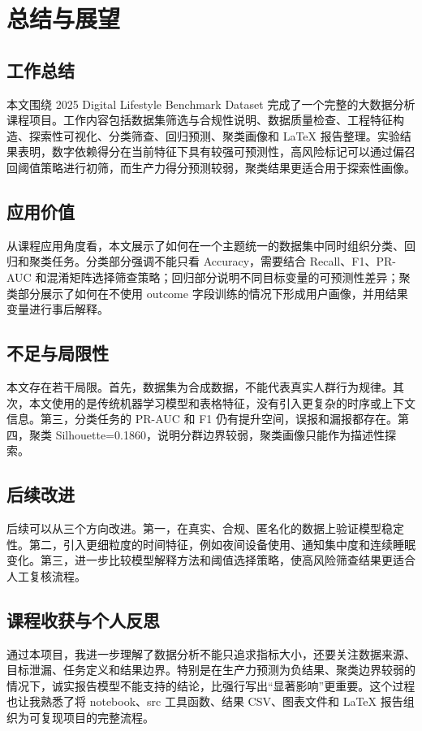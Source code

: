 \chapter{总结与展望}

\section{工作总结}

本文围绕 2025 Digital Lifestyle Benchmark Dataset 完成了一个完整的大数据分析课程项目。工作内容包括数据集筛选与合规性说明、数据质量检查、工程特征构造、探索性可视化、分类筛查、回归预测、聚类画像和 LaTeX 报告整理。实验结果表明，数字依赖得分在当前特征下具有较强可预测性，高风险标记可以通过偏召回阈值策略进行初筛，而生产力得分预测较弱，聚类结果更适合用于探索性画像。

\section{应用价值}

从课程应用角度看，本文展示了如何在一个主题统一的数据集中同时组织分类、回归和聚类任务。分类部分强调不能只看 Accuracy，需要结合 Recall、F1、PR-AUC 和混淆矩阵选择筛查策略；回归部分说明不同目标变量的可预测性差异；聚类部分展示了如何在不使用 outcome 字段训练的情况下形成用户画像，并用结果变量进行事后解释。

\section{不足与局限性}

本文存在若干局限。首先，数据集为合成数据，不能代表真实人群行为规律。其次，本文使用的是传统机器学习模型和表格特征，没有引入更复杂的时序或上下文信息。第三，分类任务的 PR-AUC 和 F1 仍有提升空间，误报和漏报都存在。第四，聚类 Silhouette=0.1860，说明分群边界较弱，聚类画像只能作为描述性探索。

\section{后续改进}

后续可以从三个方向改进。第一，在真实、合规、匿名化的数据上验证模型稳定性。第二，引入更细粒度的时间特征，例如夜间设备使用、通知集中度和连续睡眠变化。第三，进一步比较模型解释方法和阈值选择策略，使高风险筛查结果更适合人工复核流程。

\section{课程收获与个人反思}

通过本项目，我进一步理解了数据分析不能只追求指标大小，还要关注数据来源、目标泄漏、任务定义和结果边界。特别是在生产力预测为负结果、聚类边界较弱的情况下，诚实报告模型不能支持的结论，比强行写出“显著影响”更重要。这个过程也让我熟悉了将 notebook、src 工具函数、结果 CSV、图表文件和 LaTeX 报告组织为可复现项目的完整流程。
